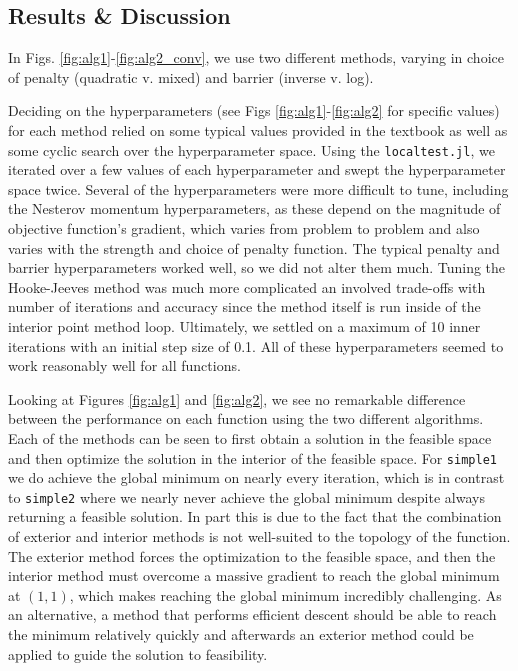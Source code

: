 \documentclass[conference]{IEEEtran}
\begin{document}
\subsection{Results \& Discussion}

In Figs. \ref{fig:alg1}-\ref{fig:alg2_conv}, we use two different methods, varying in choice of penalty (quadratic v. mixed) and barrier (inverse v. log). 

Deciding on the hyperparameters (see Figs \ref{fig:alg1}-\ref{fig:alg2} for specific values) for each method relied on some typical values provided in the textbook as well as some cyclic search over the hyperparameter space. Using the \texttt{localtest.jl}, we iterated over a few values of each hyperparameter and swept the hyperparameter space twice. Several of the hyperparameters were more difficult to tune, including the Nesterov momentum hyperparameters, as these depend on the magnitude of objective function's gradient, which varies from problem to problem and also varies with the strength and choice of penalty function. The typical penalty and barrier hyperparameters worked well, so we did not alter them much. Tuning the Hooke-Jeeves method was much more complicated an involved trade-offs with number of iterations and accuracy since the method itself is run inside of the interior point method loop. Ultimately, we settled on a maximum of 10 inner iterations with an initial step size of 0.1. All of these hyperparameters seemed to work reasonably well for all functions.

Looking at Figures \ref{fig:alg1} and \ref{fig:alg2}, we see no remarkable difference between the performance on each function using the two different algorithms. Each of the methods can be seen to first obtain a solution in the feasible space and then optimize the solution in the interior of the feasible space. For \texttt{simple1} we do achieve the global minimum on nearly every iteration, which is in contrast to \texttt{simple2} where we nearly never achieve the global minimum despite always returning a feasible solution. In part this is due to the fact that the combination of exterior and interior methods is not well-suited to the topology of the function. The exterior method forces the optimization to the feasible space, and then the interior method must overcome a massive gradient to reach the global minimum at $(1,1)$, which makes reaching the global minimum incredibly challenging. As an alternative, a method that performs efficient descent should be able to reach the minimum relatively quickly and afterwards an exterior method could be applied to guide the solution to feasibility. 
\end{document}
